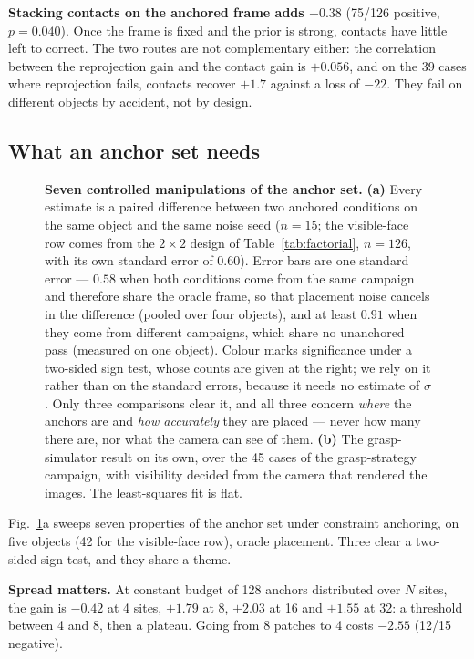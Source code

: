 \documentclass[conference]{IEEEtran}
\begin{document}
\textbf{Stacking contacts on the anchored frame adds $+0.38$} (75/126 positive,
$p = 0.040$). Once the frame is fixed and the prior is strong, contacts have little
left to correct. The two routes are not complementary either: the correlation between
the reprojection gain and the contact gain is $+0.056$, and on the 39 cases where
reprojection fails, contacts recover $+1.7$ against a loss of $-22$. They fail on
different objects by accident, not by design.

\subsection{What an anchor set needs}
\label{sec:res-anchor}

\begin{figure}[t]
\centering
\resizebox{\textwidth}{!}{}
\caption{\textbf{Seven controlled manipulations of the anchor set.}
\textbf{(a)} Every estimate is a paired difference between two anchored conditions on
the same object and the same noise seed ($n=15$; the visible-face row comes from the
$2\times2$ design of Table~\ref{tab:factorial}, $n=126$, with its own standard error of
$0.60$). Error bars are one standard error
--- $0.58$ when both conditions come from the same campaign and therefore share the
oracle frame, so that placement noise cancels in the difference (pooled over four
objects), and at least $0.91$ when they come from different campaigns, which share no
unanchored pass (measured on one object). Colour marks
significance under a two-sided sign test, whose counts are given at the right; we rely
on it rather than on the standard errors, because it needs no estimate of $\sigma$.
Only three comparisons clear it, and all three concern \emph{where} the anchors are
and \emph{how accurately} they are placed --- never how many there are, nor what the
camera can see of them. \textbf{(b)} The grasp-simulator result on its own, over the
45 cases of the grasp-strategy campaign, with visibility decided from the camera that
rendered the images. The least-squares fit is flat.}
\label{fig:results}
\end{figure}

Fig.~\ref{fig:results}a sweeps seven properties of the anchor set under constraint
anchoring, on five objects (42 for the visible-face row), oracle placement. Three clear
a two-sided sign test, and they share a theme.

\textbf{Spread matters.} At constant budget of 128 anchors distributed over $N$
sites, the gain is $-0.42$ at 4 sites, $+1.79$ at 8, $+2.03$ at 16 and $+1.55$ at 32:
a threshold between 4 and 8, then a plateau. Going from 8 patches to 4 costs $-2.55$
(12/15 negative).
\end{document}
